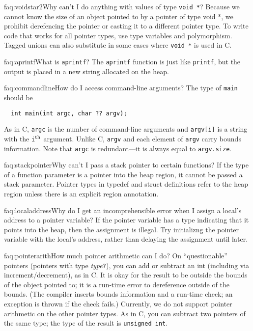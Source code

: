 \begin{faqa}{faq:voidstar2}{Why can't I do anything with values of type \texttt{void *}?}
Because we cannot know the size of an object pointed to by a pointer
of type void *, we prohibit derefencing the pointer or casting it to a
different pointer type.  To write code that works for all pointer
types, use type variables and polymorphism.  Tagged unions can also
substitute in some cases where \texttt{void *} is used in C\@.
\end{faqa}

\begin{faqa}{faq:aprintf}{What is \texttt{aprintf}?}
The \texttt{aprintf} function is just like \texttt{printf}, but
the output is placed in a new string allocated on the heap.
\end{faqa}

\begin{faqa}{faq:commandline}{How do I access command-line arguments?}
The type of \texttt{main} should be
\begin{verbatim}
  int main(int argc, char ?? argv);
\end{verbatim}
As in C, \texttt{argc} is the number of command-line arguments and
\texttt{argv[i]} is a string with the \texttt{i}$^{\rm th}$ argument.
Unlike C, \texttt{argv} and each element of \texttt{argv} carry bounds
information.  Note that \texttt{argc} is redundant---it is always
equal to \texttt{argv.size}.
\end{faqa}

\begin{faqa}{faq:stackpointer}{Why can't I pass a stack pointer to certain functions?}
If the type of a function parameter is a pointer into the heap region,
it cannot be passed a stack parameter.  Pointer types in typedef and
struct definitions refer to the heap region unless there is an
explicit region annotation.
\end{faqa}

\begin{faqa}{faq:localaddress}{Why do I get an incomprehensible error when I assign a local's address to a pointer variable?}
If the pointer variable has a type indicating that it points into the
heap, then the assignment is illegal.  Try initializng the pointer variable
with the local's address, rather than delaying the assignment until later.
\end{faqa}

\begin{faqa}{faq:pointerarith}{How much pointer arithmetic can I do?}
On ``questionable'' pointers (pointers with type
\textit{type}\texttt{?}), you can add or subtract an int (including
via increment/decrement), as in C\@.  It is okay for the result to be
outside the bounds of the object pointed to; it is a run-time error to
dereference outside of the bounds.  (The compiler inserts bounds
information and a run-time check; an exception is thrown if the check
fails.)  Currently, we do not support pointer arithmetic on the other
pointer types.  As in C, you can subtract two pointers of the same
type; the type of the result is \texttt{unsigned int}.
\end{faqa}


